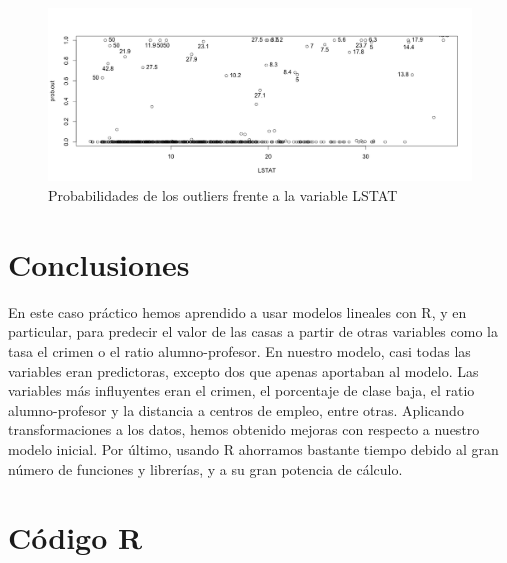 \documentclass[12pt,a4paper,twoside,openright,titlepage,final]{article}
\begin{document}
\begin{figure}[tbph!]
\centering
\includegraphics[width=0.9\linewidth]{imagenes/outliers}
\caption{Probabilidades de los outliers frente a la variable LSTAT}
\label{fig:outliers}
\end{figure}

\section{Conclusiones}

En este caso práctico hemos aprendido a usar modelos lineales con R, y en particular, para predecir el valor de las casas a partir de otras variables como la tasa el crimen o el ratio alumno-profesor. En nuestro modelo, casi todas las variables eran predictoras, excepto dos que apenas aportaban al modelo. Las variables más influyentes eran el crimen, el porcentaje de clase baja, el ratio alumno-profesor y la distancia a centros de empleo, entre otras. Aplicando transformaciones a los datos, hemos obtenido mejoras con respecto a nuestro modelo inicial. Por último, usando R ahorramos bastante tiempo debido al gran número de funciones y librerías, y a su gran potencia de cálculo.

\newpage

\section{Código R}


\end{document}
